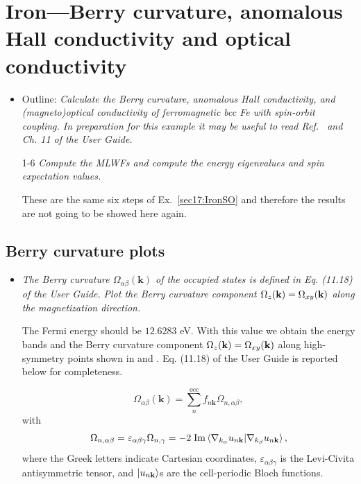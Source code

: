 \section{Iron---Berry curvature, anomalous Hall conductivity and optical conductivity}
\label{sec18:IronBerry}

\begin{itemize}
	\item Outline: {\it Calculate the Berry curvature, anomalous Hall conductivity, and (magneto)optical conductivity of ferromagnetic bcc Fe with spin-orbit coupling. In preparation for this example it may be useful to read Ref.~ and Ch. 11 of the User Guide.}
\end{itemize}

\begin{itemize}
	\item[1-6] {\it Compute the MLWFs and compute the energy eigenvalues and spin expectation values.} 

	These are the same six steps of Ex.~\ref{sec17:IronSO} and therefore the results are not going to be showed here again.
\end{itemize}

\subsection*{Berry curvature plots}
\begin{itemize}
	\item {\it The Berry curvature $\Omega_{\alpha\beta}(\mathbf{k})$ of the occupied states is defined in Eq. (11.18) of the User Guide.}
	{\it Plot the Berry curvature component $\Omega_z(\bfk) = \Omega_{xy}(\bfk)$ along the magnetization direction.}

	The Fermi energy should be $12.6283$ eV. With this value we obtain the energy bands and the Berry curvature component $\Omega_z(\bfk) = \Omega_{xy}(\bfk)$ along high-symmetry points shown in  and . Eq. (11.18) of the User Guide is reported below for completeness.

\begin{equation}
\Omega_{\alpha\beta}(\mathbf{k}) = \sum_{n}^{occ} f_{n\mathbf{k}}\Omega_{n,\alpha\beta},
\end{equation}
with
\begin{equation}
\Omega_{n,\alpha\beta} = \varepsilon_{\alpha\beta\gamma}\Omega_{n,\gamma} = -2\;\mathrm{Im}\braket{\nabla_{k_\alpha}\unk \vert \nabla_{k_\beta}\unk},
\end{equation}
where the Greek letters indicate Cartesian coordinates, $\varepsilon_{\alpha\beta\gamma}$ is the Levi-Civita antisymmetric tensor, and $\ket{u_{n\bfk}}$s 
are the cell-periodic Bloch functions.
\end{itemize}

